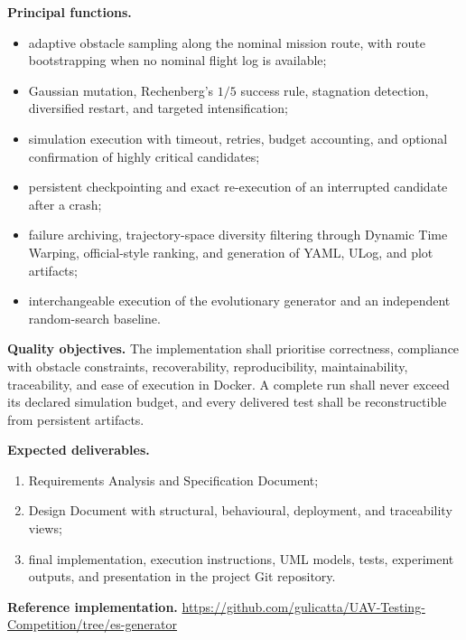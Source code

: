 \documentclass[10pt,a4paper]{article}
\begin{document}
\textbf{Principal functions.}
\begin{itemize}
  \item adaptive obstacle sampling along the nominal mission route, with route bootstrapping when no nominal flight log is available;
  \item Gaussian mutation, Rechenberg's $1/5$ success rule, stagnation detection, diversified restart, and targeted intensification;
  \item simulation execution with timeout, retries, budget accounting, and optional confirmation of highly critical candidates;
  \item persistent checkpointing and exact re-execution of an interrupted candidate after a crash;
  \item failure archiving, trajectory-space diversity filtering through Dynamic Time Warping, official-style ranking, and generation of YAML, ULog, and plot artifacts;
  \item interchangeable execution of the evolutionary generator and an independent random-search baseline.
\end{itemize}

\textbf{Quality objectives.}
The implementation shall prioritise correctness, compliance with obstacle constraints, recoverability, reproducibility, maintainability, traceability, and ease of execution in Docker. A complete run shall never exceed its declared simulation budget, and every delivered test shall be reconstructible from persistent artifacts.

\textbf{Expected deliverables.}
\begin{enumerate}[leftmargin=1.5em,itemsep=1pt,topsep=2pt]
  \item Requirements Analysis and Specification Document;
  \item Design Document with structural, behavioural, deployment, and traceability views;
  \item final implementation, execution instructions, UML models, tests, experiment outputs, and presentation in the project Git repository.
\end{enumerate}

\textbf{Reference implementation.}
\url{https://github.com/gulicatta/UAV-Testing-Competition/tree/es-generator}
\end{document}
